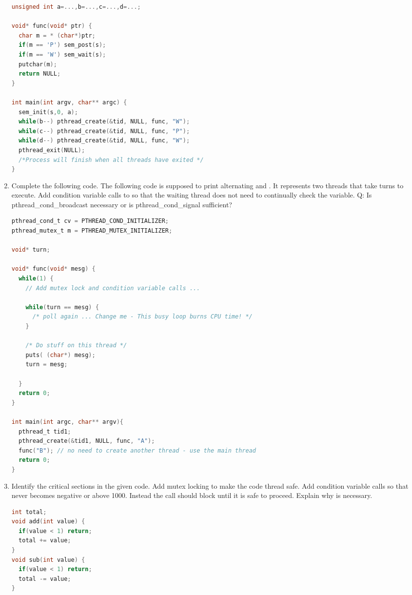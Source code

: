 \begin{enumerate}
\begin{lstlisting}[language=C]
unsigned int a=...,b=...,c=...,d=...;

void* func(void* ptr) {
  char m = * (char*)ptr;
  if(m == 'P') sem_post(s);
  if(m == 'W') sem_wait(s);
  putchar(m);
  return NULL;
}

int main(int argv, char** argc) {
  sem_init(s,0, a);
  while(b--) pthread_create(&tid, NULL, func, "W");
  while(c--) pthread_create(&tid, NULL, func, "P");
  while(d--) pthread_create(&tid, NULL, func, "W");
  pthread_exit(NULL);
  /*Process will finish when all threads have exited */
}
\end{lstlisting}

\item Complete the following code. The following code is supposed to print alternating  and . It represents two threads that take turns to execute. Add condition variable calls to  so that the waiting thread does not need to continually check the  variable. Q: Is pthread\_cond\_broadcast necessary or is pthread\_cond\_signal sufficient?

\begin{lstlisting}[language=C]
pthread_cond_t cv = PTHREAD_COND_INITIALIZER;
pthread_mutex_t m = PTHREAD_MUTEX_INITIALIZER;

void* turn;

void* func(void* mesg) {
  while(1) {
    // Add mutex lock and condition variable calls ...

    while(turn == mesg) {
      /* poll again ... Change me - This busy loop burns CPU time! */
    }

    /* Do stuff on this thread */
    puts( (char*) mesg);
    turn = mesg;

  }
  return 0;
}

int main(int argc, char** argv){
  pthread_t tid1;
  pthread_create(&tid1, NULL, func, "A");
  func("B"); // no need to create another thread - use the main thread
  return 0;
}
\end{lstlisting}

\item Identify the critical sections in the given code. Add mutex locking to make the code thread safe. Add condition variable calls so that  never becomes negative or above 1000. Instead the call should block until it is safe to proceed. Explain why  is necessary.

\begin{lstlisting}[language=C]
int total;
void add(int value) {
  if(value < 1) return;
  total += value;
}
void sub(int value) {
  if(value < 1) return;
  total -= value;
}
\end{lstlisting}


\end{enumerate}
